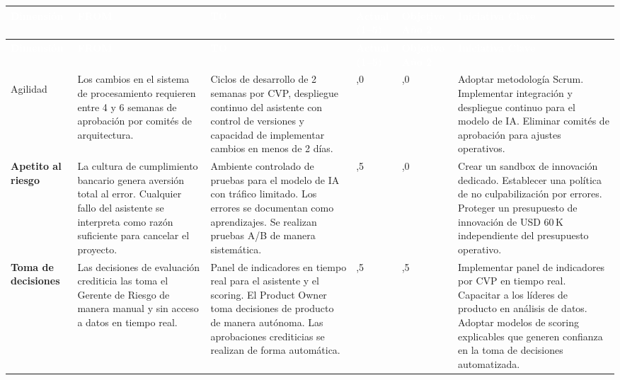 \documentclass[12pt,letterpaper]{article}
\begin{document}
\begin{longtable}{%
  >{\bfseries\RaggedRight}p{2cm}
  >{\RaggedRight}p{3.2cm}
  >{\RaggedRight}p{3.6cm}
  >{\centering}p{1.1cm}
  >{\centering}p{1.5cm}
  >{\RaggedRight}p{3.4cm}}

\rowcolor{headerblue}
\textcolor{white}{\textbf{Dimensión}} &
\textcolor{white}{\textbf{FROM}} &
\textcolor{white}{\textbf{TO}} &
\textcolor{white}{\textbf{Actual (1–5)}} &
\textcolor{white}{\textbf{Objetivo Año 2}} &
\textcolor{white}{\textbf{Iniciativa Clave}} \\
\endfirsthead

\rowcolor{headerblue}
\textcolor{white}{\textbf{Dimensión}} &
\textcolor{white}{\textbf{FROM}} &
\textcolor{white}{\textbf{TO}} &
\textcolor{white}{\textbf{Actual (1–5)}} &
\textcolor{white}{\textbf{Objetivo Año 2}} &
\textcolor{white}{\textbf{Iniciativa Clave}} \\
\endhead

\rowcolor{rowlightblue}
Agilidad &
Los cambios en el sistema de procesamiento requieren entre 4 y 6 semanas de aprobación por comités de arquitectura. &
Ciclos de desarrollo de 2 semanas por CVP, despliegue continuo del asistente con control de versiones y capacidad de implementar cambios en menos de 2 días. &
2,0 & 4,0 &
Adoptar metodología Scrum. Implementar integración y despliegue continuo para el modelo de IA. Eliminar comités de aprobación para ajustes operativos. \\

Apetito al riesgo &
La cultura de cumplimiento bancario genera aversión total al error. Cualquier fallo del asistente se interpreta como razón suficiente para cancelar el proyecto. &
Ambiente controlado de pruebas para el modelo de IA con tráfico limitado. Los errores se documentan como aprendizajes. Se realizan pruebas A/B de manera sistemática. &
1,5 & 4,0 &
Crear un sandbox de innovación dedicado. Establecer una política de no culpabilización por errores. Proteger un presupuesto de innovación de USD 60\,K independiente del presupuesto operativo. \\

\rowcolor{rowlightblue}
Toma de decisiones &
Las decisiones de evaluación crediticia las toma el Gerente de Riesgo de manera manual y sin acceso a datos en tiempo real. &
Panel de indicadores en tiempo real para el asistente y el scoring. El Product Owner toma decisiones de producto de manera autónoma. Las aprobaciones crediticias se realizan de forma automática. &
1,5 & 4,5 &
Implementar panel de indicadores por CVP en tiempo real. Capacitar a los líderes de producto en análisis de datos. Adoptar modelos de scoring explicables que generen confianza en la toma de decisiones automatizada. \\


\end{longtable}
\end{document}
